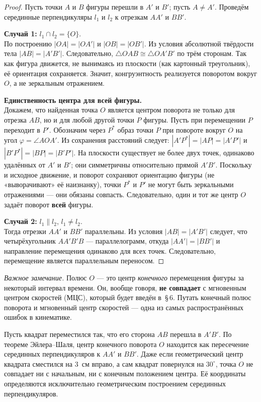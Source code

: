\documentclass[../main.tex]{subfiles}
\begin{document}
\begin{proof}
Пусть точки $A$ и $B$ фигуры перешли в $A'$ и $B'$; пусть $A \ne A'$.
Проведём серединные перпендикуляры $l_1$ и $l_2$ к отрезкам $AA'$ и $BB'$.

\noindent\textbf{Случай 1:} $l_1 \cap l_2 = \{O\}$.\\
По построению $|OA| = |OA'|$ и $|OB| = |OB'|$.
Из условия абсолютной твёрдости тела $|AB| = |A'B'|$.
Следовательно, $\triangle OAB \cong \triangle OA'B'$ по трём сторонам.
Так как фигура движется, не вынимаясь из плоскости (как картонный треугольник),
её ориентация сохраняется. Значит, конгруэнтность реализуется
поворотом вокруг $O$, а не зеркальным отражением.

\noindent\textbf{Единственность центра для всей фигуры.}\\
Докажем, что найденная точка $O$ является центром поворота не только
для отрезка $AB$, но и для любой другой точки $P$ фигуры.
Пусть при перемещении $P$ переходит в $P'$. Обозначим через $P^*$
образ точки $P$ при повороте вокруг $O$ на угол $\varphi = \angle AOA'$.
Из сохранения расстояний следует:
$|A'P^*| = |AP| = |A'P'|$ и $|B'P^*| = |BP| = |B'P'|$.
На плоскости существует не более двух точек, одинаково удалённых от $A'$ и $B'$;
они симметричны относительно прямой $A'B'$. Поскольку и исходное движение,
и поворот сохраняют ориентацию фигуры (не «выворачивают» её наизнанку),
точки $P^*$ и $P'$ не могут быть зеркальными отражениями --- они обязаны совпасть.
Следовательно, один и тот же центр $O$ задаёт поворот \textbf{всей} фигуры.

\noindent\textbf{Случай 2:} $l_1 \parallel l_2$, $l_1 \ne l_2$.\\
Тогда отрезки $AA'$ и $BB'$ параллельны. Из условия $|AB| = |A'B'|$
следует, что четырёхугольник $AA'B'B$ --- параллелограмм, откуда
$|AA'| = |BB'|$ и направление перемещения одинаково для всех точек.
Следовательно, перемещение является параллельным переносом.
\end{proof}

\noindent\textit{Важное замечание.}
Полюс $O$ --- это центр \textit{конечного} перемещения фигуры за
некоторый интервал времени. Он, вообще говоря, \textbf{не совпадает}
с мгновенным центром скоростей (МЦС), который будет введён в~\S\,6.
Путать конечный полюс поворота и мгновенный центр скоростей ---
одна из самых распространённых ошибок в кинематике.

\begin{example}
Пусть квадрат переместился так, что его сторона $AB$ перешла в $A'B'$.
По теореме Эйлера--Шаля, центр конечного поворота $O$ находится как
пересечение серединных перпендикуляров к $AA'$ и $BB'$. Даже если
геометрический центр квадрата сместился на 3~см вправо, а сам квадрат
повернулся на $30^\circ$, точка $O$ не совпадает ни с начальным, ни
с конечным положением центра. Её координаты определяются исключительно
геометрическим построением серединных перпендикуляров.
\end{example}
\end{document}
